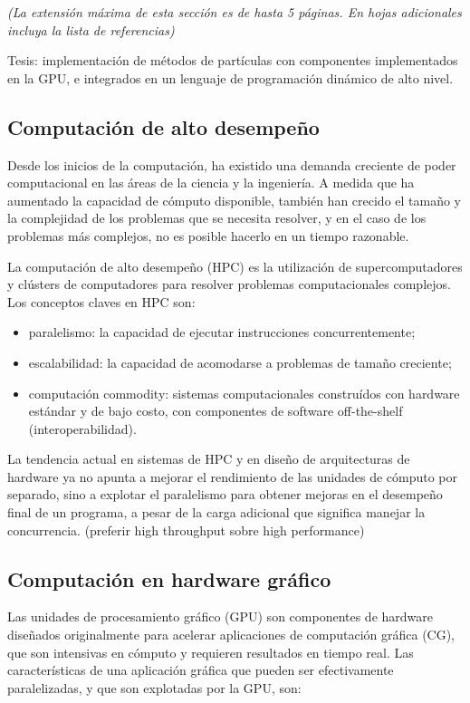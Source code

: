 \documentclass[11pt,spanish]{article}
\begin{document}
\emph{(La extensión máxima de esta sección es de hasta 5 páginas.  En hojas
adicionales incluya la lista de referencias)}
 

Tesis: implementación de métodos de partículas con componentes
implementados en la GPU, e integrados en un lenguaje de programación
dinámico de alto nivel.


\subsection{Computación de alto desempeño}

Desde los inicios de la computación, ha existido una demanda creciente de poder
computacional en las áreas de la ciencia y la ingeniería.  A medida que ha
aumentado la capacidad de cómputo disponible, también han crecido el tamaño y la
complejidad de los problemas que se necesita resolver, y en el caso de los
problemas más complejos, no es posible hacerlo en un tiempo razonable.
\cite{parallel-programming}

La computación de alto desempeño (HPC) es la utilización de supercomputadores y
clústers de computadores para resolver problemas computacionales complejos.  Los
conceptos claves en HPC son:

\begin{itemize}
   \item paralelismo:
     la capacidad de ejecutar instrucciones concurrentemente;
   \item escalabilidad:
     la capacidad de acomodarse a problemas de tamaño creciente;
   \item computación commodity:
     sistemas computacionales construídos con hardware
     estándar y de bajo costo, con componentes de software off-the-shelf
     (interoperabilidad).
\end{itemize}

La tendencia actual en sistemas de HPC y en diseño de arquitecturas de hardware
ya no apunta a mejorar el rendimiento de las unidades de cómputo por separado,
sino a explotar el paralelismo para obtener mejoras en el desempeño final de un
programa, a pesar de la carga adicional que significa manejar la concurrencia.
(preferir high throughput sobre high performance)
\cite{hpc-gpu-cuda-slides}

\subsection{Computación en hardware gráfico}
Las unidades de procesamiento gráfico (GPU) son componentes de hardware diseñados
originalmente para acelerar aplicaciones de computación gráfica (CG), que son
intensivas en cómputo y requieren resultados en tiempo real.  Las
características de una aplicación gráfica que pueden ser efectivamente
paralelizadas, y que son explotadas por la GPU, son:
\end{document}
